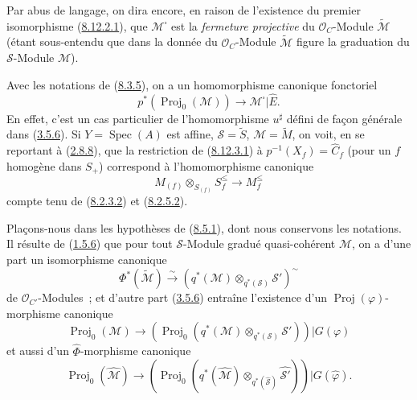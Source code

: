 Par abus de langage, on dira encore, en raison de l'existence du premier
isomorphisme (\hyperref[II.8.12.2.1-fr]{8.12.2.1}), que
$\mathcal{M}^{\square}$ est la \emph{fermeture projective} du
$\mathcal{O}_C$-Module $\widetilde{\mathcal{M}}$ (étant sous-entendu que dans
la donnée du $\mathcal{O}_C$-Module $\widetilde{\mathcal{M}}$ figure la
graduation du $\mathcal{S}$-Module $\mathcal{M}$).

\begin{env}[8.12.3]
\label{II.8.12.3-fr}
Avec les notations de (\hyperref[II.8.3.5-fr]{8.3.5}), on a un
homomorphisme canonique fonctoriel
\begin{equation}
\label{II.8.12.3.1-fr}
  p^*(\operatorname{Proj}_0(\mathcal{M}))
  \to\mathcal{M}^{\square}|\widehat{E}.
\tag{8.12.3.1}
\end{equation}
En effet, c'est un cas particulier de l'homomorphisme $u^{\sharp}$ défini de
façon générale dans (\hyperref[II.3.5.6-fr]{3.5.6}). Si
$Y=\operatorname{Spec}(A)$ est affine, $\mathcal{S}=\widetilde{S}$,
$\mathcal{M}=\widetilde{M}$, on voit, en se reportant à
(\hyperref[II.2.8.8-fr]{2.8.8}), que la restriction de
(\hyperref[II.8.12.3.1-fr]{8.12.3.1}) à
$p^{-1}(X_f)=\widehat{C}_f$ (pour un $f$ homogène dans $S_+$) correspond à
l'homomorphisme canonique
\begin{equation}
\label{II.8.12.3.2-fr}
  M_{(f)}\otimes_{S_{(f)}}S_f^{\leq}\to M_f^{\leq}
\tag{8.12.3.2}
\end{equation}
compte tenu de (\hyperref[II.8.2.3.2-fr]{8.2.3.2}) et
(\hyperref[II.8.2.5.2-fr]{8.2.5.2}).
\end{env}

\begin{env}[8.12.4]
\label{II.8.12.4-fr}
Plaçons-nous dans les hypothèses de (\hyperref[II.8.5.1-fr]{8.5.1}), dont
nous conservons les notations. Il résulte de
(\hyperref[II.1.5.6-fr]{1.5.6}) que pour tout $\mathcal{S}$-Module gradué
quasi-cohérent $\mathcal{M}$, on a d'une part un isomorphisme canonique
\begin{equation}
\label{II.8.12.4.1-fr}
  \Phi^*(\widetilde{\mathcal{M}})
  \xrightarrow{\sim}
  \left(q^*(\mathcal{M})\otimes_{q^*(\mathcal{S})}\mathcal{S}'\right)^{\sim}
\tag{8.12.4.1}
\end{equation}
de $\mathcal{O}_{C'}$-Modules~; et d'autre part
(\hyperref[II.3.5.6-fr]{3.5.6}) entraîne l'existence d'un
$\operatorname{Proj}(\varphi)$-morphisme canonique
\begin{equation}
\label{II.8.12.4.2-fr}
  \operatorname{Proj}_0(\mathcal{M})\to
  \left(\operatorname{Proj}_0
  (q^*(\mathcal{M})\otimes_{q^*(\mathcal{S})}\mathcal{S}')\right)
  |G(\varphi)
\tag{8.12.4.2}
\end{equation}
et aussi d'un $\widehat{\Phi}$-morphisme canonique
\begin{equation}
\label{II.8.12.4.3-fr}
  \operatorname{Proj}_0(\widehat{\mathcal{M}})\to
  \left(\operatorname{Proj}_0
  (q^*(\widehat{\mathcal{M}})
  \otimes_{q^*(\widehat{\mathcal{S}})}\widehat{\mathcal{S}'})\right)
  |G(\widehat{\varphi}).
\tag{8.12.4.3}
\end{equation}
\end{env}


